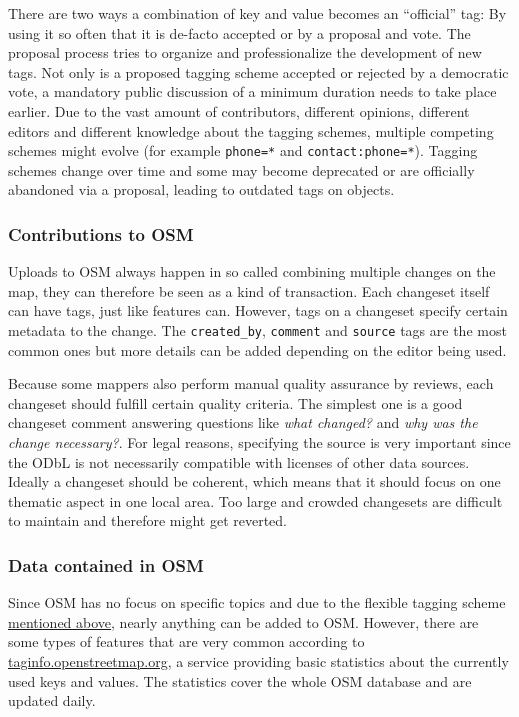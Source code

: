 			There are two ways a combination of key and value becomes an \enquote{official} tag:
			By using it so often that it is de-facto accepted or by a proposal and vote.
			The proposal process tries to organize and professionalize the development of new tags.
			Not only is a proposed tagging scheme accepted or rejected by a democratic vote, a mandatory public discussion of a minimum duration needs to take place earlier.
			Due to the vast amount of contributors, different opinions, different editors and different knowledge about the tagging schemes, multiple competing schemes might evolve (for example \texttt{phone=*} and \texttt{contact:phone=*}).
			Tagging schemes change over time and some may become deprecated or are officially abandoned via a proposal, leading to outdated tags on objects.
			
		\subsubsection{Contributions to OSM}
		
			Uploads to OSM always happen in so called  combining multiple changes on the map\cite{osm-wiki-changeset}, they can therefore be seen as a kind of transaction.
			Each changeset itself can have tags, just like features can.
			However, tags on a changeset specify certain metadata to the change.
			The \texttt{created\_by}, \texttt{comment} and \texttt{source} tags are the most common ones but more details can be added depending on the editor being used.
			
			Because some mappers also perform manual quality assurance by reviews, each changeset should fulfill certain quality criteria.
			The simplest one is a good changeset comment answering questions like \textit{what changed?} and \textit{why was the change necessary?}.
			For legal reasons, specifying the source is very important since the ODbL is not necessarily compatible with licenses of other data sources.
			Ideally a changeset should be coherent, which means that it should focus on one thematic aspect in one local area.
			Too large and crowded changesets are difficult to maintain and therefore might get reverted.
			
		\subsubsection{Data contained in OSM}
		
			Since OSM has no focus on specific topics and due to the flexible tagging scheme \hyperref[subsubsec:osm-attributes]{mentioned above}, nearly anything can be added to OSM.
			However, there are some types of features that are very common according to \href{https://taginfo.openstreetmap.org/keys}{taginfo.openstreetmap.org}, a service providing basic statistics about the currently used keys and values\cite{taginfo-keys}.
			The statistics cover the whole OSM database and are updated daily.
			
